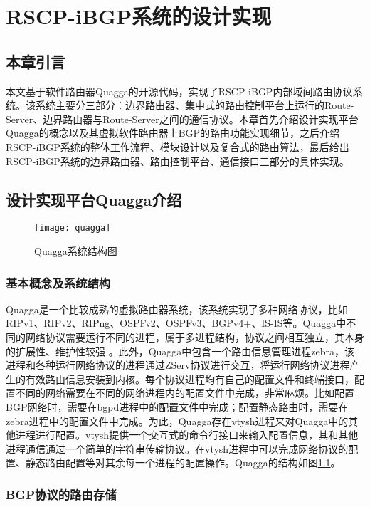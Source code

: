 \chapter{RSCP-iBGP系统的设计实现}
\label{cha:design}

\section{本章引言}
本文基于软件路由器Quagga\cite{quagga}的开源代码，实现了RSCP-iBGP内部域间路由协议系统。该系统主要分三部分：边界路由器、集中式的路由控制平台上运行的Route-Server、边界路由器与Route-Server之间的通信协议。本章首先介绍设计实现平台Quagga的概念以及其虚拟软件路由器上BGP的路由功能实现细节，之后介绍RSCP-iBGP系统的整体工作流程、模块设计以及复合式的路由算法，最后给出RSCP-iBGP系统的边界路由器、路由控制平台、通信接口三部分的具体实现。

\section{设计实现平台Quagga介绍}


\begin{figure}
  \centering
  \texttt{[image: quagga]}
  \caption{Quagga系统结构图\cite{jakma2014quagga}}
  \label{fig:quagga}
\end{figure}


\subsection{基本概念及系统结构}
Quagga是一个比较成熟的虚拟路由器系统，该系统实现了多种网络协议，比如RIPv1、RIPv2、RIPng、OSPFv2、OSPFv3、BGPv4+、IS-IS等。Quagga中不同的网络协议需要运行不同的进程，属于多进程结构，协议之间相互独立，其本身的扩展性、维护性较强 \cite{quaggaThesis}。此外，Quagga中包含一个路由信息管理进程zebra，该进程和各种运行网络协议的进程通过ZServ协议进行交互，将运行网络协议进程产生的有效路由信息安装到内核\cite{jakma2014quagga}。每个协议进程均有自己的配置文件和终端接口，配置不同的网络需要在不同的网络进程内的配置文件中完成，非常麻烦。比如配置BGP网络时，需要在bgpd进程中的配置文件中完成；配置静态路由时，需要在zebra进程中的配置文件中完成。为此，Quagga存在vtysh进程来对Quagga中的其他进程进行配置。vtysh提供一个交互式的命令行接口来输入配置信息，其和其他进程通信通过一个简单的字符串传输协议。在vtysh进程中可以完成网络协议的配置、静态路由配置等对其余每一个进程的配置操作。Quagga的结构如图\ref{fig:quagga}。
\subsection{BGP协议的路由存储}

